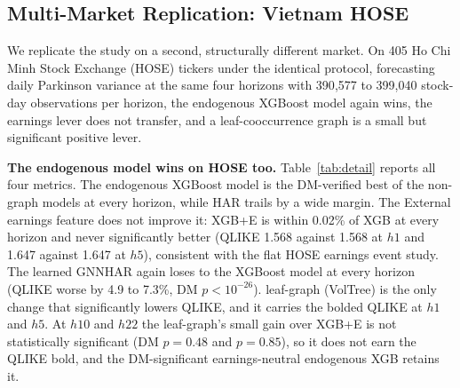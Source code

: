 \documentclass[runningheads]{llncs}
\begin{document}
\FloatBarrier
\subsection{Multi-Market Replication: Vietnam HOSE}\label{sec:hose}
We replicate the study on a second, structurally different market. On 405 Ho Chi Minh Stock Exchange
(HOSE) tickers under the identical protocol, forecasting daily Parkinson variance at the same four
horizons with 390{,}577 to 399{,}040 stock-day observations per horizon, the endogenous XGBoost model
again wins, the earnings lever does not transfer, and a leaf-cooccurrence graph is a small but
significant positive lever.

\textbf{The endogenous model wins on HOSE too.} Table~\ref{tab:detail} reports all four
metrics. The endogenous XGBoost model is the DM-verified best of the non-graph models at every
horizon, while HAR trails by a wide margin. The External earnings feature does not improve it:
XGB+E is within 0.02\% of XGB at every horizon and never significantly better (QLIKE 1.568 against
1.568 at $h1$ and 1.647 against 1.647 at $h5$), consistent with the flat HOSE earnings event study. The
learned GNNHAR again loses to the XGBoost model at every horizon (QLIKE worse by 4.9 to 7.3\%,
DM $p<10^{-26}$).
leaf-graph (VolTree) is the only change that significantly lowers QLIKE, and it carries the bolded
QLIKE at $h1$ and $h5$. At $h10$ and $h22$ the leaf-graph's small gain over XGB+E is not statistically
significant (DM $p=0.48$ and $p=0.85$), so it does not earn the QLIKE bold, and the DM-significant
earnings-neutral endogenous XGB retains it.
\end{document}
